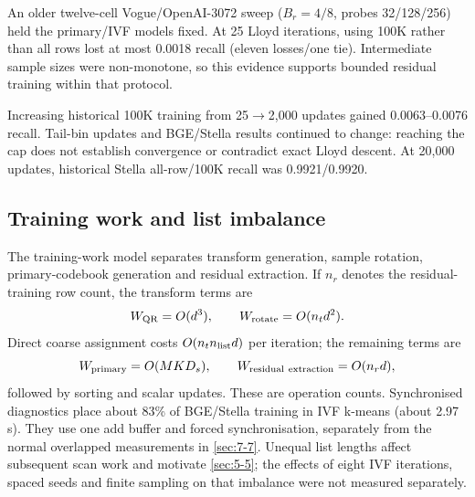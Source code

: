 An older twelve-cell Vogue/OpenAI-3072 sweep ($B_r=4/8$, probes 32/128/256)
held the primary/IVF models fixed. At 25 Lloyd iterations, using 100K
rather than all rows lost at most 0.0018 recall (eleven losses/one tie).
Intermediate sample sizes were non-monotone, so this evidence supports
bounded residual training within that protocol.

Increasing historical 100K training from 25$\to$2,000 updates gained
0.0063--0.0076 recall. Tail-bin updates and BGE/Stella results continued
to change: reaching the cap does not establish convergence or contradict
exact Lloyd descent. At 20,000 updates, historical Stella all-row/100K
recall was 0.9921/0.9920.

\subsection{Training work and list imbalance}

The training-work model separates transform generation, sample rotation,
primary-codebook generation and residual extraction. If $n_r$ denotes
the residual-training row count, the transform terms are
\[
 W_{\rm QR}=O(d^3),\qquad W_{\rm rotate}=O(n_t d^2).
\]
Direct coarse assignment costs $O(n_t n_{\rm list}d)$ per iteration;
the remaining terms are
\[
 W_{\rm primary}=O(MKD_s),\qquad
 W_{\rm residual\ extraction}=O(n_rd),
\]
followed by sorting and scalar updates. These are operation counts.
Synchronised diagnostics place about 83\% of BGE/Stella training in IVF
k-means (about 2.97\,s). They use one add buffer and forced
synchronisation, separately from the normal overlapped measurements in
\cref{sec:7-7}. Unequal list lengths affect subsequent scan work and
motivate \cref{sec:5-5}; the effects of eight IVF iterations, spaced seeds
and finite sampling on that imbalance were not measured separately.
